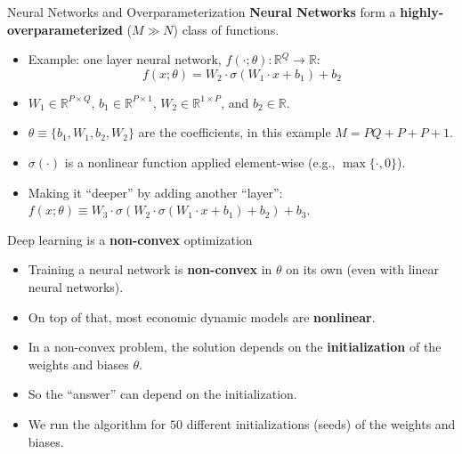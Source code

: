 \documentclass[aspectratio=169,10pt]{beamer}
\newcommand{\emphcolor}[1]{\textbf{\textcolor{emphcolorval}{#1}}}
\begin{document}
\begin{frame}{Neural Networks and Overparameterization}
	\emphcolor{Neural Networks} form a \emphcolor{highly-overparameterized} ($M\gg N$) class of functions.
	\begin{itemize}

		\item Example: one layer neural network, $f(\cdot;\theta) : \mathbb{R}^Q\rightarrow \mathbb{R}$:
		\begin{equation*}
			f(x;\theta) = W_2 \cdot \sigma \left(W_1\cdot x+b_1\right)+b_2
		\end{equation*}
		\vspace{0.1in}
		\item $W_1\in \mathbb{R}^{P\times Q}$, $b_1\in \mathbb{R}^{P\times 1}$, $W_2 \in \mathbb{R}^{1\times P}$, and $b_2 \in \mathbb{R}$.
		\vspace{0.1in}
		\item $\theta \equiv \{b_1,W_1,b_2,W_2\}$ are the coefficients, in this example $M = PQ+P+P+1$.
		\vspace{0.1in}
		\item $\sigma(\cdot)$ is a nonlinear function applied element-wise (e.g., $\max\{\cdot,0\}$).
		\vspace{0.1in}
		\item Making it ``deeper'' by adding another ``layer'':
		$f(x;\theta)\equiv W_3\cdot\sigma(W_2 \cdot \sigma(W_1 \cdot x + b_1) + b_2)+b_3.$
	\end{itemize}
\end{frame}

\begin{frame}{Deep learning is a \emphcolor{non-convex} optimization}
	\begin{itemize}
		\item Training a neural network is \emphcolor{non-convex} in $\theta$ on its own (even with linear neural networks).
		\vspace{0.1in}
		\item On top of that, most economic dynamic models are \emphcolor{nonlinear}.
		\vspace{0.1in}
		\item In a non-convex problem, the solution depends on the \emphcolor{initialization} of the weights and biases $\theta$.
		\vspace{0.1in}
		\item So the ``answer'' can depend on the initialization.
		\vspace{0.1in}
		\item We run the algorithm for $50$ different initializations (seeds) of the weights and biases.
	\end{itemize}
\end{frame}
\end{document}
